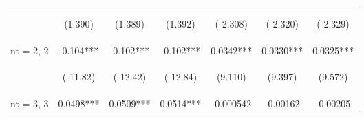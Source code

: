 \documentclass[]{article}
\begin{document}
\begin{center}
\begin{tabular}{lcccccc}
        \vspace{4pt}     & \begin{footnotesize}(1.390)\end{footnotesize}  & \begin{footnotesize}(1.389)\end{footnotesize}  & \begin{footnotesize}(1.392)\end{footnotesize}  & \begin{footnotesize}(-2.308)\end{footnotesize} & \begin{footnotesize}(-2.320)\end{footnotesize} & \begin{footnotesize}(-2.329)\end{footnotesize} \\
        nt = 2, 2        & -0.104***                                      & -0.102***                                      & -0.102***                                      & 0.0342***                                      & 0.0330***                                      & 0.0325***                                      \\
        \vspace{4pt}     & \begin{footnotesize}(-11.82)\end{footnotesize} & \begin{footnotesize}(-12.42)\end{footnotesize} & \begin{footnotesize}(-12.84)\end{footnotesize} & \begin{footnotesize}(9.110)\end{footnotesize}  & \begin{footnotesize}(9.397)\end{footnotesize}  & \begin{footnotesize}(9.572)\end{footnotesize}  \\
        nt = 3, 3        & 0.0498***                                      & 0.0509***                                      & 0.0514***                                      & -0.000542                                      & -0.00162                                       & -0.00205                                       \\

\end{tabular}
\end{center}
\end{document}

